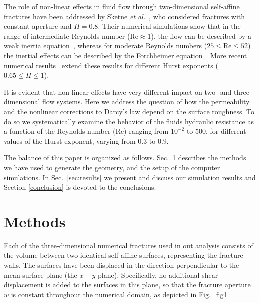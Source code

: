 \documentclass[aps,pre,
superscriptaddress,
twocolumn,
notitlepage,
10pt,
]{revtex4-1}
\begin{document}
The role of non-linear effects in fluid flow through two-dimensional self-affine
fractures have been addressed by Sketne \emph{et al.}~\cite{Skjetne1999}, who
considered fractures with constant aperture and $H=0.8$.
%
Their numerical simulations show that in the range of intermediate
Reynolds number ($\mathrm{Re} \approx 1$), the flow can be described
by a weak inertia equation~\cite{Mei1991, WODIE1991},  whereas for moderate
Reynolds numbers ($25 \leq \mathrm{Re} \leq 52$) the inertial effects can
be described by the Forchheimer equation~\cite{Forchheimer1901}. More
recent numerical results~\cite{Briggs2017} extend these results for
different Hurst exponents ($0.65 \leq H \leq 1$).


It is evident that non-linear effects have very different impact on two-
and three-dimensional flow systems. Here we address the question of how the
permeability and the nonlinear corrections to Darcy's law depend on the
surface roughness. To do so we systematically examine the behavior of the
fluids hydraulic resistance as a function of the Reynolds number
($\mathrm{Re}$) ranging from $10^{-2}$ to $500$, for different values of
the Hurst exponent, varying from $0.3$ to $0.9$.

The balance of this paper is organized as follows. Sec.~\ref{sec:methods}
describes the methods we have used to generate the geometry, and the setup
of the computer simulations. In Sec.~\ref{sec:results} we present and
discuss our simulation results and Section \ref{conclusion} is devoted to
the conclusions.

\section{Methods}\label{sec:methods}

Each of the three-dimensional numerical fractures used in out analysis consists
of the volume between  two identical self-affine surfaces, representing the
fracture walls. The surfaces have been displaced in the direction perpendicular
to the mean surface plane (the $x-y$ plane). Specifically, no additional shear
displacement is added to the surfaces in this plane, so that the fracture
aperture $w$ is constant throughout the numerical domain, as depicted in
Fig.~\ref{fig1}.
\end{document}
